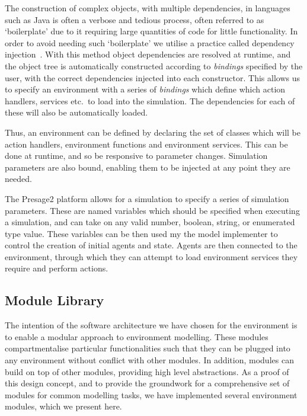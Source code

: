 The construction of complex objects, with multiple dependencies, in languages
such as Java is often a verbose and tedious process, often referred to as 
`boilerplate' due to it requiring large quantities of code for little
functionality. In order to avoid needing such `boilerplate' we utilise a
practice called dependency injection~\citep{vanbrabant2008}. With this method
object dependencies are resolved at runtime, and the object tree is
automatically constructed according to \emph{bindings} specified by the user, with the
correct dependencies injected into each constructor. This allows us to specify
an environment with a series of \emph{bindings} which define which action
handlers, services etc.\ to load into the simulation. The dependencies for each of
these will also be automatically loaded.


Thus, an environment can be defined by declaring the set of classes which will
be action handlers, environment functions and environment services. This can be
done at runtime, and so be responsive to parameter changes. Simulation
parameters are also bound, enabling them to be injected at any point they are
needed.

The Presage2 platform allows for a simulation to specify a series of simulation
parameters. These are named variables which should be specified when executing a
simulation, and can take on any valid number, boolean, string, or enumerated
type value. These variables can be then used my the model implementer to control
the creation of initial agents and state. Agents are then connected to the
environment, through which they can attempt to load environment services they
require and perform actions.

\subsection{Module Library}

The intention of the software architecture we have chosen for the environment is
to enable a modular approach to environment modelling. These modules
compartmentalise particular functionalities such that they can be plugged into
any environment without conflict with other modules. In addition, modules
can build on top of other modules, providing high level abstractions. As a proof
of this design concept, and to provide the groundwork for a comprehensive set of
modules for common modelling tasks, we have implemented several environment
modules, which we present here.

